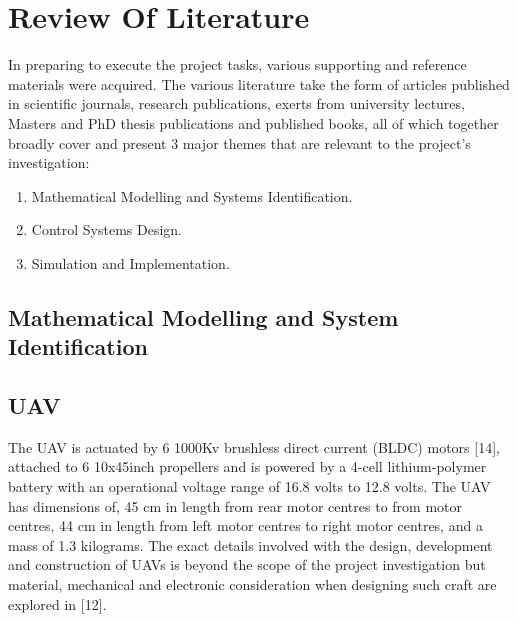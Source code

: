 \documentclass[12pt,a4paper,twoside]{report}
\begin{document}
	\newpage
	
	\section{Review Of Literature }	
	
		In preparing to execute the project tasks, various supporting and reference materials were acquired. The various literature take the form of articles published in scientific journals, research publications, exerts from university lectures, Masters and PhD thesis publications and published books, all of which together broadly cover and present 3 major themes that are relevant to the project’s investigation:
		
		\begin{enumerate}
			\item 
				Mathematical Modelling and Systems Identification. 
			\item 
				Control Systems Design.
			\item 
				Simulation and Implementation.
		\end{enumerate}
	
		\newpage
		
		\subsection{Mathematical Modelling and System Identification}
			
			\subsection*{UAV}
				
				The UAV is actuated by 6 1000Kv brushless direct current (BLDC) motors [14], attached to 6 10x45inch propellers and is powered by a 4-cell lithium-polymer battery with an operational voltage range of 16.8 volts to 12.8 volts. The UAV has dimensions of, 45 cm in length from rear motor centres to from motor centres, 44 cm in length from left motor centres to right motor centres, and a mass of 1.3 kilograms. The exact details involved with the design, development and construction of UAVs is beyond the scope of the project investigation but material, mechanical and electronic consideration when designing such craft are explored in [12].
				
\end{document}
